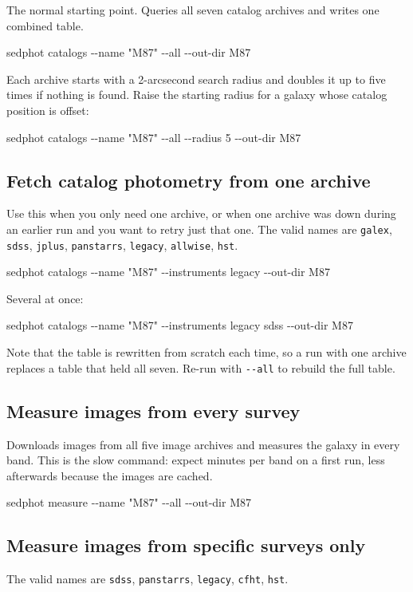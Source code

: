 \documentclass[11pt]{article}
\newcommand{\cmdline}[1]{\begin{cmd}\ttfamily #1\end{cmd}}
\begin{document}
The normal starting point. Queries all seven catalog archives and writes
one combined table.

\cmdline{sedphot catalogs -{}-name "M87" -{}-all -{}-out-dir M87}

Each archive starts with a 2-arcsecond search radius and doubles it up to
five times if nothing is found. Raise the starting radius for a galaxy
whose catalog position is offset:

\cmdline{sedphot catalogs -{}-name "M87" -{}-all -{}-radius 5 -{}-out-dir M87}

\subsection{Fetch catalog photometry from one archive}

Use this when you only need one archive, or when one archive was down
during an earlier run and you want to retry just that one. The valid names
are \texttt{galex}, \texttt{sdss}, \texttt{jplus}, \texttt{panstarrs},
\texttt{legacy}, \texttt{allwise}, \texttt{hst}.

\cmdline{sedphot catalogs -{}-name "M87" -{}-instruments legacy -{}-out-dir M87}

Several at once:

\cmdline{sedphot catalogs -{}-name "M87" -{}-instruments legacy sdss -{}-out-dir M87}

Note that the table is rewritten from scratch each time, so a run with one
archive replaces a table that held all seven. Re-run with
\texttt{-{}-all} to rebuild the full table.

\subsection{Measure images from every survey}

Downloads images from all five image archives and measures the galaxy in
every band. This is the slow command: expect minutes per band on a first
run, less afterwards because the images are cached.

\cmdline{sedphot measure -{}-name "M87" -{}-all -{}-out-dir M87}

\subsection{Measure images from specific surveys only}

The valid names are \texttt{sdss}, \texttt{panstarrs}, \texttt{legacy},
\texttt{cfht}, \texttt{hst}.
\end{document}

